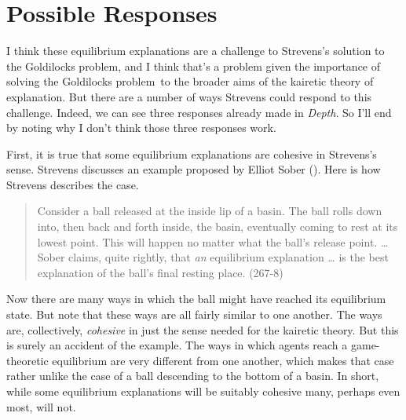 \documentclass[
  11pt,
  letterpaper,
  DIV=11,
  numbers=noendperiod,
  oneside]{scrartcl}
\begin{document}
\section{Possible Responses}\label{possible-responses}

I think these equilibrium explanations are a challenge to Strevens's
solution to the Goldilocks problem, and I think that's a problem given
the importance of solving the Goldilocks problem~to the broader aims of
the kairetic theory of explanation. But there are a number of ways
Strevens could respond to this challenge. Indeed, we can see three
responses already made in \emph{Depth}. So I'll end by noting why I
don't think those three responses work.

First, it is true that some equilibrium explanations are cohesive in
Strevens's sense. Strevens discusses an example proposed by Elliot Sober
(). Here is how Strevens describes the
case.

\begin{quote}
Consider a ball released at the inside lip of a basin. The ball rolls
down into, then back and forth inside, the basin, eventually coming to
rest at its lowest point. This will happen no matter what the ball's
release point. \ldots{} Sober claims, quite rightly, that \emph{an}
equilibrium explanation \ldots{} is the best explanation of the ball's
final resting place. (267-8)
\end{quote}

Now there are many ways in which the ball might have reached its
equilibrium state. But note that these ways are all fairly similar to
one another. The ways are, collectively, \emph{cohesive} in just the
sense needed for the kairetic theory. But this is surely an accident of the example. The ways
in which agents reach a game-theoretic equilibrium are very different
from one another, which makes that case rather unlike the case of a ball
descending to the bottom of a basin. In short, while some equilibrium
explanations will be suitably cohesive many, perhaps even most, will
not.
\end{document}
